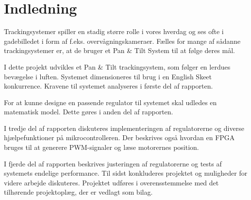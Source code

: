 \section*{Indledning}
Trackingsystemer spiller en stadig større rolle i vores hverdag og ses ofte i gadebilledet i form 
af f.eks. overvågningskameraer.
Fælles for mange af sådanne trackingsystemer er, at de bruger et Pan \& Tilt System til at følge deres mål. 

I dette projekt udvikles et Pan \& Tilt trackingsystem, som følger en lerdues bevægelse i 
luften. Systemet dimensioneres til brug i en English Skeet konkurrence. Kravene til systemet analyseres i første del af rapporten. 

For at kunne designe en passende regulator til systemet skal udledes en matematisk model. Dette gøres i anden del af rapporten. 

I tredje del af rapporten diskuteres implementeringen af regulatorerne og diverse hjælpefunktioner på mikrocontrolleren. Der beskrives også hvordan en FPGA bruges til at generere PWM-signaler og læse motorernes position. 

I fjerde del af rapporten beskrives justeringen af regulatorerne og tests af systemets endelige performance.
Til sidst konkluderes projektet og muligheder for videre arbejde diskuteres.
Projektet udføres i overensstemmelse med det tilhørende projektoplæg, der er vedlagt 
som bilag.
